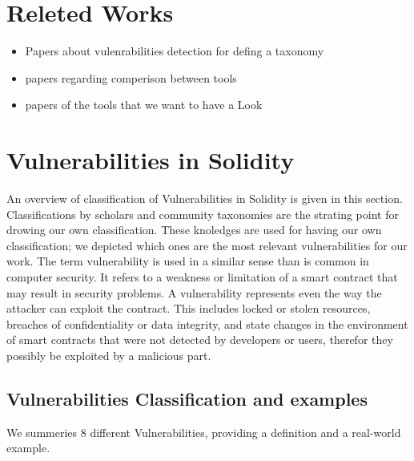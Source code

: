 \documentclass[a4paper,sigconf, language=french,
language=german, language=spanish, language=english]{acmart}
\begin{document}
\section{Releted Works}
\label{RelatedWorks}
\begin{itemize}
  \item Papers about vulenrabilities detection for defing a taxonomy
  \item papers regarding comperison between tools
  \item papers of the tools that we want to have a Look
\end{itemize}

\citet{SystematicReviewVuln} 

\section{Vulnerabilities in Solidity}
\label{Vulnerabilities}
An overview of classification of Vulnerabilities in Solidity is given in this section. 
Classifications by scholars and community taxonomies are the strating point for drowing our own classification. 
These knoledges are used for having our own classification; we depicted which ones are the most relevant 
vulnerabilities for our work.
The term vulnerability is used in a similar sense than is common in computer security. 
It refers to a weakness or limitation of a smart contract that may result in
security problems. 
A vulnerability represents even the way the attacker can exploit the contract. 
This includes locked or stolen resources, breaches of confidentiality or data integrity, and state
changes in the environment of smart contracts that were not
detected by developers or users, therefor they possibly be exploited by a malicious part.

\subsection{Vulnerabilities Classification and examples}
\label{sec:Vulnerabilities:Classification}
We summeries 8 different Vulnerabilities, providing a definition and a real-world example.
\end{document}
